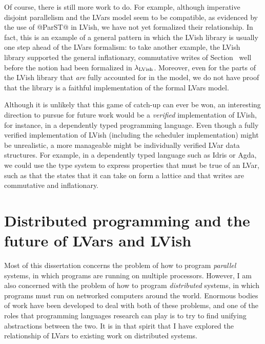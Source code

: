 Of course, there is still more work to do.  For example, although
imperative disjoint parallelism and the LVars model seem to be
compatible, as evidenced by the use of @ParST@ in LVish, we have not
yet formalized their relationship.  In fact, this is an example of a
general pattern in which the LVish library is usually one step ahead
of the LVars formalism: to take another example, the LVish library
supported the general inflationary, commutative writes of
Section~\either{\ref{subsection:lvars-generalizing-from-least-upper-bound-writes}}{\ref{s:lvars-generalizing}}
well before the notion had been formalized in $\lambda_{\textrm{LVish}}$.
Moreover, even for the parts of the LVish library that \emph{are}
fully accounted for in the model, we do not have proof that the
library is a faithful implementation of the formal LVars model.

Although it is unlikely that this game of catch-up can ever be won, an
interesting direction to pursue for future work would be a
\emph{verified} implementation of LVish, for instance, in a
dependently typed programming language.  Even though a fully verified
implementation of LVish (including the scheduler implementation) might
be unrealistic, a more manageable might be individually verified
LVar data structures.  For example, in a dependently typed language
such as Idris or Agda, we could use the type system to express
properties that must be true of an LVar, such as that the states that
it can take on form a lattice and that writes are commutative and
inflationary.

\ifdefined\DISSERTATION
\section{Distributed programming and the future of LVars and LVish}


Most of this dissertation concerns the problem of how to program
\emph{parallel} systems, in which programs are running on multiple
processors.  However, I am also concerned with the problem of how to
program \emph{distributed} systems, in which programs must run on
networked computers around the world.  Enormous bodies of work have
been developed to deal with both of these problems, and one of the
roles that programming languages research can play is to try to find
unifying abstractions between the two. It is in that spirit that I
have explored the relationship of LVars to existing work on
distributed systems.

